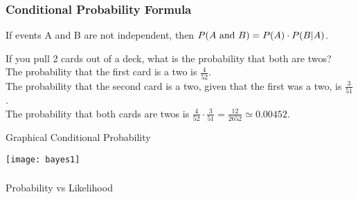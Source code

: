 \begin{frame}
\frametitle{Conditional Probability Formula}
If events A and B are not independent, then $P(A\hbox{ and }B) = P(A) \cdot P(B | A)$.



If you pull 2 cards out of a deck, what is the probability that both are twos?\\ 
\vspace{.1in}
The probability that the first card is a two is  $\frac{4}{52}$.\\ 
\vspace{.1in}
The probability that the second card is a two, given that the first was a two, is  $\frac{3}{51}$.\\ 
\vspace{.1in}
The probability that both cards are twos is  $\frac{4}{52}\cdot \frac{3}{51}=\frac{12}{2652}\simeq 0.00452$.

\end{frame}


%
%
\begin{frame}{ Graphical Conditional Probability}

\begin{center}
\texttt{[image: bayes1]}
\end{center}
\end{frame}

\begin{frame}[fragile]\frametitle{}
\begin{center}
{\Large Probability vs Likelihood}
\end{center}
\end{frame}

